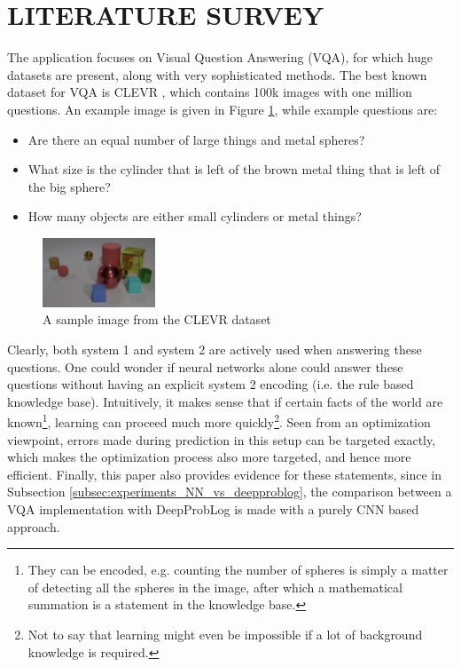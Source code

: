 \documentclass[english]{sobraep}
\begin{document}
\section{LITERATURE SURVEY}
\label{sec:literature_survey}
The application focuses on Visual Question Answering (VQA), for which huge datasets are present, along with very sophisticated methods. The best known dataset for VQA is CLEVR \cite{clevr_dataset}, which contains 100k images with one million questions. An example image is given in Figure \ref{fig:sample_image_clevr}, while example questions are:
\begin{itemize}
    \item Are there an equal number of large things and metal spheres?
    \item What size is the cylinder that is left of the brown metal thing that is left of the big sphere?
    \item How many objects are either small cylinders or metal things?
\end{itemize}

\begin{figure}[H]
    \begin{center}
    \includegraphics[width=0.3\textwidth]{clevr.jpg}
    \captionsetup{justification=centering}
    \caption{A sample image from the CLEVR dataset \cite{clevr_dataset}}
    \label{fig:sample_image_clevr}
    \end{center}
\end{figure}

Clearly, both system 1 and system 2 are actively used when answering these questions. One could wonder if neural networks alone could answer these questions without having an explicit system 2 encoding (i.e. the rule based knowledge base). Intuitively, it makes sense that if certain facts of the world are known\footnote{They can be encoded, e.g. counting the number of spheres is simply a matter of detecting all the spheres in the image, after which a mathematical summation is a statement in the knowledge base.}, learning can proceed much more quickly\footnote{Not to say that learning might even be impossible if a lot of background knowledge is required.}. Seen from an optimization viewpoint, errors made during prediction in this setup can be targeted exactly, which makes the optimization process also more targeted, and hence more efficient. Finally, this paper also provides evidence for these statements, since in Subsection \ref{subsec:experiments_NN_vs_deepproblog}, the comparison between a VQA implementation with DeepProbLog is made with a purely CNN based approach. %
\end{document}
